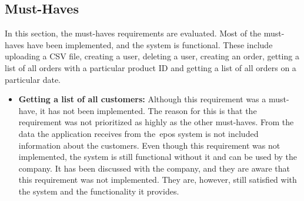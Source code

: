 \subsection{Must-Haves}\label{subsec:must-haves}

In this section, the must-haves requirements are evaluated.
Most of the must-haves have been implemented, and the system is functional.
These include uploading a CSV file, creating a user, deleting a user, creating an order, getting a list of all orders
with a particular product ID and getting a list of all orders on a particular date.

\begin{itemize}
    \item \textbf{Getting a list of all customers:}
    Although this requirement was a must-have, it has not been implemented.
    The reason for this is that the requirement was not prioritized as highly as the other must-haves.
    From the data the application receives from the~\acrshort{epos} system is not included information about the
    customers.
    Even though this requirement was not implemented, the system is still functional without it and can be used by the
    company.
    It has been discussed with the company, and they are aware that this requirement was not implemented.
    They are, however, still satisfied with the system and the functionality it provides.
\end{itemize}
